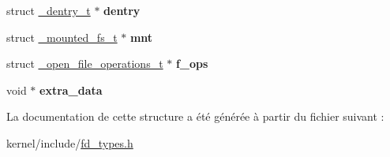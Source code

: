 \begin{DoxyCompactItemize}
\item 
\hypertarget{struct__open__file__descriptor_a3b375ad15f7bcb8e92123bd1a17765f3}{struct \hyperlink{struct__dentry__t}{\-\_\-dentry\-\_\-t} $\ast$ {\bfseries dentry}}\label{struct__open__file__descriptor_a3b375ad15f7bcb8e92123bd1a17765f3}

\item 
\hypertarget{struct__open__file__descriptor_a65408e330b7a3763de5549c826564730}{struct \hyperlink{struct__mounted__fs__t}{\-\_\-mounted\-\_\-fs\-\_\-t} $\ast$ {\bfseries mnt}}\label{struct__open__file__descriptor_a65408e330b7a3763de5549c826564730}

\item 
\hypertarget{struct__open__file__descriptor_a6cd707cf9a5d837feba5ef2a2f91bfcd}{struct \hyperlink{struct__open__file__operations__t}{\-\_\-open\-\_\-file\-\_\-operations\-\_\-t} $\ast$ {\bfseries f\-\_\-ops}}\label{struct__open__file__descriptor_a6cd707cf9a5d837feba5ef2a2f91bfcd}

\item 
\hypertarget{struct__open__file__descriptor_a99824795a31a8adea2162aed74162017}{void $\ast$ {\bfseries extra\-\_\-data}}\label{struct__open__file__descriptor_a99824795a31a8adea2162aed74162017}

\end{DoxyCompactItemize}


La documentation de cette structure a été générée à partir du fichier suivant \-:\begin{DoxyCompactItemize}
\item 
kernel/include/\hyperlink{fd__types_8h}{fd\-\_\-types.\-h}\end{DoxyCompactItemize}
